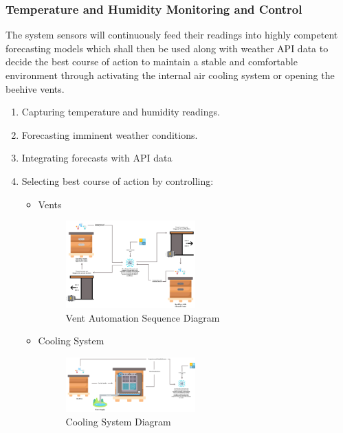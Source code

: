 \documentclass[12pt]{article}
\begin{document}
	\subsubsection{Temperature and Humidity Monitoring and Control}
	The system sensors will continuously feed their readings into highly competent forecasting models which shall then be used along with weather API data to decide the best course of action to maintain a stable and comfortable environment through activating the internal air cooling system or opening the beehive vents.
	\begin{enumerate}
		\item Capturing temperature and humidity readings.
		\item Forecasting imminent weather conditions.
		\item Integrating forecasts with API data
		\item Selecting best course of action by controlling:
		\newpage
		\begin{itemize}
			\item Vents
			\begin{figure}[H]
				\centering
				\includegraphics[width=0.5\textwidth]{Images/Diagrams/Vents.png}
				\caption{Vent Automation Sequence Diagram}
				\label{fig:VENTS}
			\end{figure}
			\vspace{1 cm}
			\item Cooling System
			\begin{figure}[H]
				\centering
				\includegraphics[width=0.5\textwidth]{Images/Diagrams/Cooling System.png}
				\caption{Cooling System Diagram}
				\label{fig:COOLING}
			\end{figure}
		\end{itemize}
	\end{enumerate}
	
\end{document}
